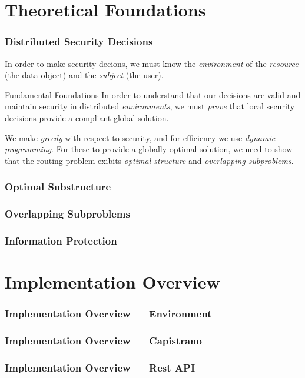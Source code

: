 \documentclass[t,handout, 10pt]{beamer}
\begin{document}
\section{Theoretical Foundations}
\begin{frame}
\frametitle{Distributed Security Decisions}
In order to make security decions, we must know the {\it environment} of the {\it resource} (the data object) and the {\it subject} (the user).
\pause
\newline
\newline
\newline
\begin{beamerboxesrounded}[shadow]{Fundamental Foundations}
In order to understand that our decisions are valid and maintain security in distributed {\it environments}, we must {\it prove} that local security decisions provide a compliant global solution. 
\end{beamerboxesrounded}
\pause
\newline
\newline
\newline
We make {\it greedy} with respect to security, and for efficiency we use {\it dynamic programming}.  For these to provide a globally optimal solution, we need to show that the routing problem exibits {\it optimal structure} and {\it overlapping subproblems}.
\end{frame}

\begin{frame}
\frametitle{Optimal Substructure}
\end{frame}

\begin{frame}
\frametitle{Overlapping Subproblems}
\end{frame}

\begin{frame}
\frametitle{Information Protection}
\end{frame}

\section{Implementation Overview}
\begin{frame}
\frametitle{Implementation Overview --- Environment}
\end{frame}

\begin{frame}
\frametitle{Implementation Overview --- Capistrano}
\end{frame}

\begin{frame}
\frametitle{Implementation Overview --- Rest API}
\end{frame}
\end{document}
